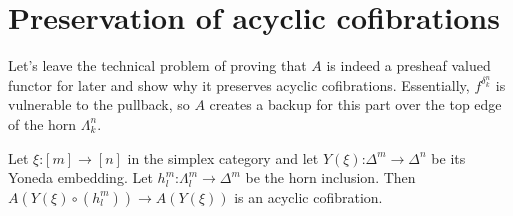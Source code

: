 \documentclass{tac}
\newcommand\of{\mathord:}
\begin{document}
\section{Preservation of acyclic cofibrations}
Let's leave the technical problem of proving that \( A \) is indeed a presheaf valued
functor for later and show why it preserves acyclic cofibrations. 
Essentially, \( f^{\delta^n_k} \) is vulnerable to the pullback, so \( A \) creates a 
backup for this part over the top edge of the horn \( \Lambda^n_k \). 

\begin{lemma}
  Let \(\xi\of[m]\to[n]\) in the simplex category and let \(
    Y(\xi)\of \Delta^m \to \Delta^n \) be its Yoneda embedding.
  Let \(h^m_l \of \Lambda^m_l\to\Delta^m\) be the
  horn inclusion. Then \( A(Y(\xi)\circ(h^m_l))\to A(Y(\xi)) \) is an acyclic
  cofibration.
\end{lemma}
\end{document}

